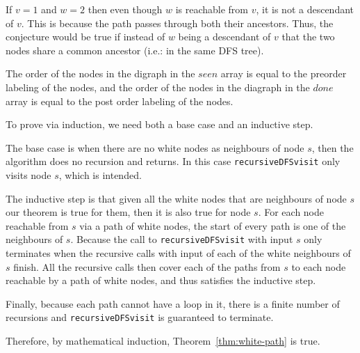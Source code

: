 If \(v=1\) and \(w=2\) then even though \(w\) is reachable from
\(v\), it is not a descendant of \(v\).  This is because the path
passes through both their ancestors. Thus, the conjecture would be
true if instead of \(w\) being a descendant of \(v\) that the two
nodes share a common ancestor (i.e.: in the same DFS tree).

\fi

The order of the nodes in the digraph in the \(seen\) array is equal to the preorder labeling 
of the nodes, and the order of the nodes in the diagraph in the \(done\) array is equal to the 
post order labeling of the nodes.


To prove via induction, we need both a base case and an inductive step.

The base case is when there are no white nodes as neighbours of node \(s\), then the 
algorithm does no recursion and returns. In this case
\texttt{recursiveDFSvisit} only visits node \(s\), which is intended.

The inductive step is that given all the white nodes that are
neighbours of node \(s\) 
our theorem is true for them, then it is also true for node \(s\). 
For each node reachable from \(s\) 
via a path of white nodes, the start of every path is one of the
neighbours of \(s\). Because the 
call to \texttt{recursiveDFSvisit} with input \(s\) only terminates when the 
recursive calls with input of each of the white
neighbours of \(s\) finish. 
All the recursive calls then cover each of the paths from \(s\) to 
each node reachable by a path of white nodes, and thus satisfies the 
inductive step.

Finally, because each path cannot have a loop in it, there is 
a finite number of 
recursions and \texttt{recursiveDFSvisit} is guaranteed to terminate.

Therefore, by mathematical induction, Theorem~\ref{thm:white-path} is true.

